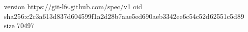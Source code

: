 version https://git-lfs.github.com/spec/v1
oid sha256:c2c3a613d837d604599f1a2d28b7aae5ed690aeb3342ee6c54c52d62551c5d89
size 70497
